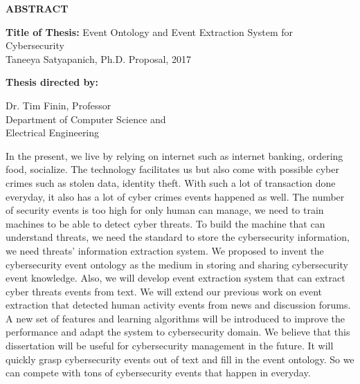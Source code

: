 \newpage
\pagestyle{empty}

\begin{center}
\vspace{0.1in}
\large{\bf ABSTRACT} \par  
\bigskip \bigskip
\end{center}

\begin{flushleft}
{\bf Title of Thesis:} 
Event Ontology and Event Extraction System for Cybersecurity\\
Taneeya Satyapanich, Ph.D. Proposal, 2017 \\
\begin{singlespace}
{\bf Thesis directed by:}{\hspace{2.5mm}} \parbox[t]{3in}{Dr. Tim Finin, Professor \\
Department of Computer Science and \\ Electrical Engineering}
\end{singlespace}
\end{flushleft}

In the present, we live by relying on internet such as internet banking, ordering food, socialize. The technology facilitates us but also come with possible cyber crimes such as stolen data, identity theft. With such a lot of transaction done everyday, it also has a lot of cyber crimes events happened as well. The number of security events is too high for only human can manage, we need to train machines to be able to detect cyber threats. To build the machine that can understand threats, we need the standard to store the cybersecurity information, we need threats' information extraction system. We proposed to invent the cybersecurity event ontology as the medium in storing and sharing cybersecurity event knowledge. Also, we will develop event extraction system that can extract cyber threats events from text. We will extend our previous work on event extraction that detected human activity events from news and discussion forums. A new set of features and learning algorithms will be introduced to improve the performance and adapt the system to cybersecurity domain. We believe that this dissertation will be useful for cybersecurity management in the future. It will quickly grasp cybersecurity events out of text and fill in the event ontology. So we can compete with tons of cybersecurity events that happen in everyday.


\par\vfil

